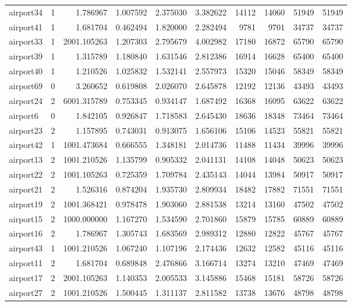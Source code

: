 \begin{longtable}{|l|r|r|r|r|r|r|r|r|r|}
airport34 & 1 & 1.786967 & 1.007592 & 2.375030 & 3.382622 & 14112 & 14060 & 51949 & 51949 \\
airport41 & 1 & 1.681704 & 0.462494 & 1.820000 & 2.282494 & 9781 & 9701 & 34737 & 34737 \\
airport33 & 1 & 2001.105263 & 1.207303 & 2.795679 & 4.002982 & 17180 & 16872 & 65790 & 65790 \\
airport39 & 1 & 1.315789 & 1.180840 & 1.631546 & 2.812386 & 16914 & 16628 & 65400 & 65400 \\
airport40 & 1 & 1.210526 & 1.025832 & 1.532141 & 2.557973 & 15320 & 15046 & 58349 & 58349 \\
airport69 & 0 & 3.260652 & 0.619808 & 2.026070 & 2.645878 & 12192 & 12136 & 43493 & 43493 \\
airport24 & 2 & 6001.315789 & 0.753345 & 0.934147 & 1.687492 & 16368 & 16095 & 63622 & 63622 \\
airport6 & 0 & 1.842105 & 0.926847 & 1.718583 & 2.645430 & 18636 & 18348 & 73464 & 73464 \\
airport23 & 2 & 1.157895 & 0.743031 & 0.913075 & 1.656106 & 15106 & 14523 & 55821 & 55821 \\
airport42 & 1 & 1001.473684 & 0.666555 & 1.348181 & 2.014736 & 11488 & 11434 & 39996 & 39996 \\
airport13 & 2 & 1001.210526 & 1.135799 & 0.905332 & 2.041131 & 14108 & 14048 & 50623 & 50623 \\
airport22 & 2 & 1001.105263 & 0.725359 & 1.709784 & 2.435143 & 14044 & 13984 & 50917 & 50917 \\
airport21 & 2 & 1.526316 & 0.874204 & 1.935730 & 2.809934 & 18482 & 17882 & 71551 & 71551 \\
airport19 & 2 & 1001.368421 & 0.978478 & 1.903060 & 2.881538 & 13214 & 13160 & 47502 & 47502 \\
airport15 & 2 & 1000.000000 & 1.167270 & 1.534590 & 2.701860 & 15879 & 15785 & 60889 & 60889 \\
airport16 & 2 & 1.786967 & 1.305743 & 1.683569 & 2.989312 & 12880 & 12822 & 45767 & 45767 \\
airport43 & 1 & 1001.210526 & 1.067240 & 1.107196 & 2.174436 & 12632 & 12582 & 45116 & 45116 \\
airport11 & 2 & 1.681704 & 0.689848 & 2.476866 & 3.166714 & 13274 & 13210 & 47469 & 47469 \\
airport17 & 2 & 2001.105263 & 1.140353 & 2.005533 & 3.145886 & 15468 & 15181 & 58726 & 58726 \\
airport27 & 2 & 1001.210526 & 1.500445 & 1.311137 & 2.811582 & 13738 & 13676 & 48798 & 48798 \\

\end{longtable}
